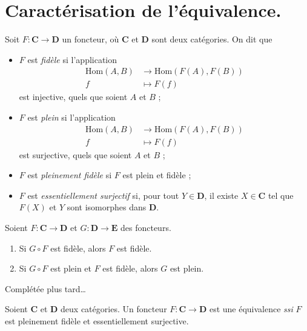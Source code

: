 \section{Caractérisation de l'équivalence.}

\begin{defn}
  Soit $F : \mathbf{C} \to \mathbf{D}$ un foncteur, où $\mathbf{C}$ et $\mathbf{D}$ sont deux catégories.
  On dit que
  \begin{itemize}
    \item $F$ est \textit{fidèle} si l'application 
      \begin{align*}
        \mathrm{Hom}(A,B) &\longrightarrow \mathrm{Hom}(F(A),F(B)) \\
        f &\longmapsto F(f )
      \end{align*}
      est injective, quels que soient $A$ et $B$ ;
    \item $F$ est \textit{plein} si l'application 
      \begin{align*}
        \mathrm{Hom}(A,B) &\longrightarrow \mathrm{Hom}(F(A),F(B)) \\
        f &\longmapsto F(f )
      \end{align*}
      est surjective, quels que soient $A$ et $B$ ;
    \item $F$ est \textit{pleinement fidèle} si $F$ est plein et fidèle ;
    \item $F$ est \textit{essentiellement surjectif} si, pour tout $Y \in \mathbf{D}$, il existe $X \in \mathbf{C}$ tel que $F(X)$ et $Y$ sont isomorphes dans $\mathbf{D}$.
  \end{itemize}
\end{defn}

\begin{prop}
  Soient $F : \mathbf{C} \to \mathbf{D}$ et $G : \mathbf{D} \to \mathbf{E}$ des foncteurs.
  \begin{enumerate}
    \item Si $G \circ F$ est fidèle, alors $F$ est fidèle.
    \item Si $G \circ F$ est plein et $F$ est fidèle, alors $G$ est plein.
  \end{enumerate}
\end{prop}
\begin{prv}
  Complétée plus tard\ldots
\end{prv}

\begin{thm}
  Soient $\mathbf{C}$ et $\mathbf{D}$ deux catégories.
  Un foncteur $F : \mathbf{C} \to \mathbf{D}$ est une équivalence \textit{ssi} $F$ est pleinement fidèle et essentiellement surjective.
\end{thm}

